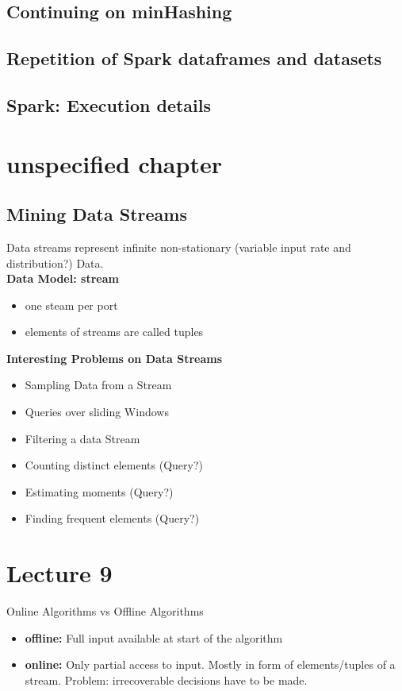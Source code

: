 \documentclass[]{article}
\begin{document}
\subsection{Continuing on minHashing}

\subsection{Repetition of Spark dataframes and datasets}

\subsection{Spark: Execution details}


\section{unspecified chapter}
\subsection{Mining Data Streams}
Data streams represent infinite non-stationary (variable input rate and distribution?) Data. \\
\textbf{Data Model: stream}
\begin{itemize}
\item one steam per port
\item elements of streams are called tuples
\end{itemize}
\textbf{Interesting Problems on Data Streams}
\begin{itemize}
\item Sampling Data from a Stream
\item Queries over sliding Windows
\item Filtering a data Stream
\item Counting distinct elements (Query?)
\item Estimating moments (Query?)
\item Finding frequent elements (Query?)
\end{itemize}


\section{Lecture 9}
Online Algorithms vs Offline Algorithms
\begin{itemize}
\item \textbf{offline:} Full input available at start of the algorithm
\item \textbf{online: } Only partial access to input. Mostly in form of elements/tuples of a stream. Problem: irrecoverable decisions have to be made.
\end{itemize}
\end{document}

